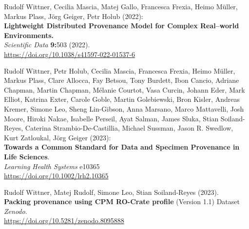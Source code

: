 \documentclass[10pt,letterpaper]{article}
\begin{document}
\begin{thebibliography}{10}
\begin{small}
Rudolf Wittner, Cecilia Mascia, Matej Gallo, Francesca Frexia, Heimo Müller, Markus Plass, Jörg Geiger, Petr Holub (2022):\\
\textbf{Lightweight Distributed Provenance Model for Complex Real--world
Environments.\\
}\emph{Scientific Data} \textbf{9:}503 (2022).\\
\url{https://doi.org/10.1038/s41597-022-01537-6}

Rudolf Wittner, Petr Holub, Cecilia Mascia, Francesca Frexia, Heimo Müller, Markus Plass, Clare Allocca, Fay Betsou, Tony Burdett, Ibon Cancio, Adriane Chapman, Martin Chapman, Mélanie Courtot, Vasa Curcin, Johann Eder, Mark Elliot, Katrina Exter, Carole Goble, Martin Golebiewski, Bron Kisler, Andreas Kremer, Simone Leo, Sheng Lin-Gibson, Anna Marsano, Marco Mattavelli, Josh Moore, Hiroki Nakae, Isabelle Perseil, Ayat Salman, James Sluka, Stian Soiland-Reyes, Caterina Strambio-De-Castillia, Michael Sussman, Jason R. Swedlow, Kurt Zatloukal, Jörg Geiger (2023):\\
\textbf{Towards a Common Standard for Data and Specimen Provenance in
Life Sciences}.\\
\emph{Learning Health Systems} e10365\\
\url{https://doi.org/10.1002/lrh2.10365}

 Rudolf Wittner, Matej Rudolf, Simone Leo, Stian Soiland-Reyes (2023).\\
\textbf{Packing provenance using CPM RO-Crate profile} (Version 1.1)
Dataset\\
\emph{Zenodo}.\\
\url{https://doi.org/10.5281/zenodo.8095888}


\end{small}
\end{thebibliography}
\end{document}
